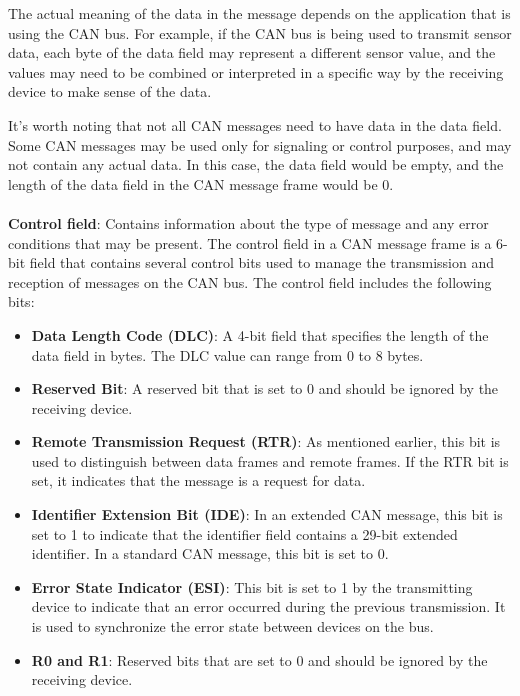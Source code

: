 \documentclass[12pt]{article}
\begin{document}
The actual meaning of the data in the message depends on the application that is using the CAN bus. For example, if the CAN bus is being used to transmit sensor data, each byte of the data field may represent a different sensor value, and the values may need to be combined or interpreted in a specific way by the receiving device to make sense of the data.

It's worth noting that not all CAN messages need to have data in the data field. Some CAN messages may be used only for signaling or control purposes, and may not contain any actual data. In this case, the data field would be empty, and the length of the data field in the CAN message frame would be 0.
\\ \\
\textbf{Control field}: Contains information about the type of message and any error conditions that may be present. The control field in a CAN message frame is a 6-bit field that contains several control bits used to manage the transmission and reception of messages on the CAN bus. The control field includes the following bits:


\begin{itemize}
    \item \textbf{Data Length Code (DLC)}: A 4-bit field that specifies the length of the data field in bytes. The DLC value can range from 0 to 8 bytes.
    \item \textbf{Reserved Bit}: A reserved bit that is set to 0 and should be ignored by the receiving device.
    \item \textbf {Remote Transmission Request (RTR)}: As mentioned earlier, this bit is used to distinguish between data frames and remote frames. If the RTR bit is set, it indicates that the message is a request for data.
    \item \textbf{Identifier Extension Bit (IDE)}: In an extended CAN message, this bit is set to 1 to indicate that the identifier field contains a 29-bit extended identifier. In a standard CAN message, this bit is set to 0.
    \item \textbf{Error State Indicator (ESI)}: This bit is set to 1 by the transmitting device to indicate that an error occurred during the previous transmission. It is used to synchronize the error state between devices on the bus.
    \item \textbf{R0 and R1}: Reserved bits that are set to 0 and should be ignored by the receiving device.
\end{itemize}
\end{document}
